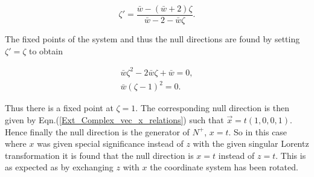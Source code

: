 \begin{appendix}
\begin{equation*}
\zeta' = \frac{\bar{w} - (\bar{w} +2)\zeta}{\bar{w} -2 - \bar{w}\zeta}. 
\end{equation*}

\noindent The fixed points of the system and thus the null directions are found by setting $\zeta' = \zeta$ to obtain

\begin{gather*}
\bar{w} \zeta^2 - 2 \bar{w} \zeta + \bar{w} = 0,\\
\bar{w}(\zeta-1)^2 = 0.
\end{gather*}

\noindent Thus there is a fixed point at $\zeta = 1$. The corresponding null direction is then given by Eqn.(\ref{Ext_Complex_vec_x_relations}) such that $\vec{x}= t(1,0,0,1)$. Hence finally the null direction is the generator of $N^+$, $x=t$. So in this case where $x$ was given special significance instead of $z$ with the given singular Lorentz transformation it is found that the null direction is $x=t$ instead of $z=t$. This is as expected as by exchanging $z$ with $x$ the coordinate system has been rotated. 








\end{appendix}
